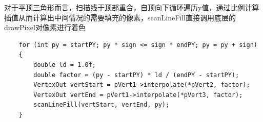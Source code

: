     \begin{spacing}{2.5}
    对于平顶三角形而言，扫描线于顶部重合，自顶向下循环遍历y值，通过比例计算插值从而计算出中间情况的需要填充的像素，scanLineFill直接调用底层的drawPixel对像素进行着色
    
    	
    \end{spacing}

	\begin{lstlisting}
    for (int py = startPY; py * sign <= sign * endPY; py = py + sign)
    {
    	double ld = 1.0f;
       	double factor = (py - startPY) * ld / (endPY - startPY);
       	VertexOut vertStart = pVert1->interpolate(*pVert2, factor);
       	VertexOut vertEnd = pVert1->interpolate(*pVert3, factor);
       	scanLineFill(vertStart, vertEnd, py);
   	}
	\end{lstlisting}


